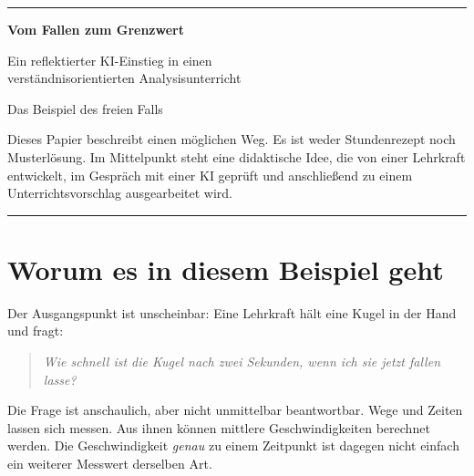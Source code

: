 \documentclass[11pt,a4paper]{article}
\newenvironment{leitgedanke}
  {\begin{quote}\color{dunkelblau}\itshape}
  {\end{quote}}
\begin{document}
\hypersetup{pageanchor=false}
\begin{titlepage}
  \thispagestyle{empty}
  \vspace*{28mm}

  {\color{dunkelblau}\rule{\textwidth}{1.1pt}}

  \vspace{12mm}

  {\huge\bfseries Vom Fallen zum Grenzwert\par}
  \vspace{5mm}
  {\Large Ein reflektierter KI-Einstieg in einen\\
  verständnisorientierten Analysisunterricht\par}

  \vspace{14mm}

  {\large Das Beispiel des freien Falls\par}

  \vfill

  \begin{minipage}{0.86\textwidth}
    \color{grau}
    Dieses Papier beschreibt einen möglichen Weg. Es ist weder Stundenrezept
    noch Musterlösung. Im Mittelpunkt steht eine didaktische Idee, die von einer
    Lehrkraft entwickelt, im Gespräch mit einer KI geprüft und anschließend zu
    einem Unterrichtsvorschlag ausgearbeitet wird.
  \end{minipage}

  \vspace{15mm}
  {\color{dunkelblau}\rule{\textwidth}{1.1pt}}
\end{titlepage}

\hypersetup{pageanchor=true}
\tableofcontents
\newpage
{}

\section{Worum es in diesem Beispiel geht}

Der Ausgangspunkt ist unscheinbar: Eine Lehrkraft hält eine Kugel in der Hand
und fragt:

\begin{leitgedanke}
Wie schnell ist die Kugel nach zwei Sekunden, wenn ich sie jetzt fallen lasse?
\end{leitgedanke}

Die Frage ist anschaulich, aber nicht unmittelbar beantwortbar. Wege und Zeiten
lassen sich messen. Aus ihnen können mittlere Geschwindigkeiten berechnet
werden. Die Geschwindigkeit \emph{genau} zu einem Zeitpunkt ist dagegen nicht
einfach ein weiterer Messwert derselben Art.
\end{document}

